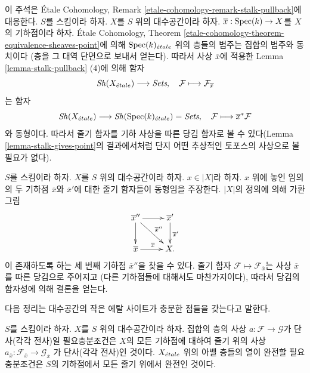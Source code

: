 \begin{remark}
\label{remark-stalk-pullback}
이 주석은 \'Etale Cohomology, Remark
\ref{etale-cohomology-remark-stalk-pullback}에 대응한다.
$S$를 스킴이라 하자.
$X$를 $S$ 위의 대수공간이라 하자.
$\overline{x} : \mathop{\mathrm{Spec}}(k) \to X$를 $X$의 기하점이라 하자.
\'Etale Cohomology, Theorem
\ref{etale-cohomology-theorem-equivalence-sheaves-point}에 의해
$\mathop{\mathrm{Spec}}(k)_{\acute{e}tale}$ 위의 층들의 범주는 집합의 범주와 동치이다
(층을 그 대역 단면으로 보내서 얻는다).
따라서 사상 $\overline{x}$에 적용한
Lemma \ref{lemma-stalk-pullback} (4)에 의해 함자
$$
\mathop{\mathit{Sh}}\nolimits(X_{\acute{e}tale}) \longrightarrow \textit{Sets}, \quad
\mathcal{F} \longmapsto \mathcal{F}_{\overline{x}}
$$
는 함자
$$
\mathop{\mathit{Sh}}\nolimits(X_{\acute{e}tale})
\longrightarrow
\mathop{\mathit{Sh}}\nolimits(\mathop{\mathrm{Spec}}(k)_{\acute{e}tale}) = \textit{Sets},
\quad
\mathcal{F} \longmapsto \overline{x}^*\mathcal{F}
$$
와 동형이다. 따라서 줄기 함자를 기하 사상을 따른 당김 함자로
볼 수 있다(Lemma \ref{lemma-stalk-gives-point}의 결과에서처럼
단지 어떤 추상적인 토포스의 사상으로 볼 필요가 없다).
\end{remark}

\begin{remark}
\label{remark-map-stalks}
$S$를 스킴이라 하자.
$X$를 $S$ 위의 대수공간이라 하자.
$x \in |X|$라 하자.
$x$ 위에 놓인 임의의 두 기하점 $\overline{x}$와
$\overline{x}'$에 대한 줄기 함자들이 동형임을 주장한다.
$|X|$의 정의에 의해 가환 그림
$$
\xymatrix{
\overline{x}'' \ar[r] \ar[d] \ar[rd]^{\overline{x}''} &
\overline{x}' \ar[d]^{\overline{x}'} \\
\overline{x} \ar[r]^{\overline{x}} & X.
}
$$
이 존재하도록 하는 세 번째 기하점 $\overline{x}''$을 찾을 수 있다.
줄기 함자 $\mathcal{F} \mapsto \mathcal{F}_{\overline{x}}$는
사상 $\overline{x}$를 따른 당김으로 주어지고
(다른 기하점들에 대해서도 마찬가지이다), 따라서 당김의 함자성에 의해
결론을 얻는다.
\end{remark}




\noindent
다음 정리는 대수공간의 작은 에탈 사이트가 충분한 점들을 갖는다고
말한다.

\begin{theorem}
\label{theorem-exactness-stalks}
$S$를 스킴이라 하자. $X$를 $S$ 위의 대수공간이라 하자.
집합의 층의 사상 $a : \mathcal{F} \to \mathcal{G}$가
단사(각각 전사)일 필요충분조건은 $X$의 모든 기하점에 대하여
줄기 위의 사상
$a_{\overline{x}} : \mathcal{F}_{\overline{x}} \to \mathcal{G}_{\overline{x}}$
가 단사(각각 전사)인 것이다.
$X_{\acute{e}tale}$ 위의 아벨 층들의 열이 완전할 필요충분조건은
$S$의 기하점에서 모든 줄기 위에서 완전인 것이다.
\end{theorem}

